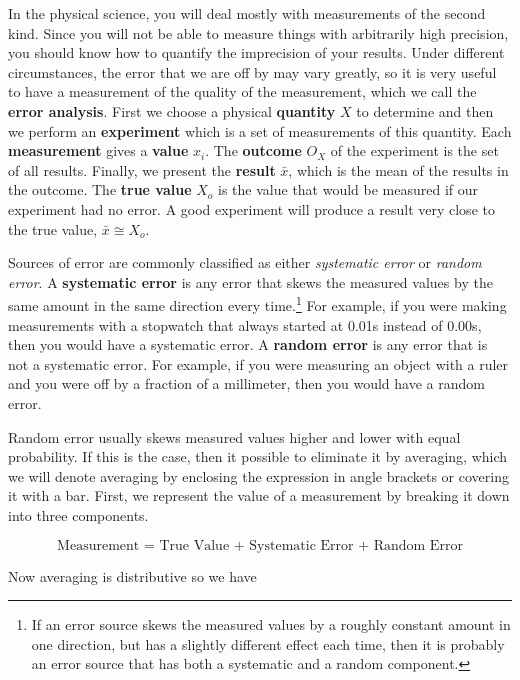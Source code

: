 In the physical science, you will deal mostly with measurements of the second kind. Since you will not be able to measure things with arbitrarily high precision, you should know how to quantify the imprecision of your results.
 Under different circumstances, the error that we are off by may vary greatly, so it is very useful to have a measurement of the quality of the measurement, which we call the \textbf{error analysis}. First we choose a physical \textbf{quantity} $X$ to determine and then we perform an \textbf{experiment} which is a set of measurements of this quantity. Each \textbf{measurement} gives a \textbf{value} $x_i$. The \textbf{outcome} $O_X$ of the experiment is the set of all results. Finally, we present the \textbf{result} $\bar{x}$, which is the mean of the results in the outcome. The \textbf{true value} $X_o$ is the value that would be measured if our experiment had no error. A good experiment will produce a result very close to the true value, $\bar{x} \cong X_o$.

Sources of error are commonly classified as either \textit{systematic error} or \textit{random error}. A \textbf{systematic error} is any error that skews the measured values by the same amount in the same direction every time.\footnote{If an error source skews the measured values by a roughly constant amount in one direction, but has a slightly different effect each time, then it is probably an error source that has both a systematic and a random component.} For example, if you were making measurements with a stopwatch that always started at 0.01s instead of 0.00s, then you would have a systematic error. A \textbf{random error} is any error that is not a systematic error. For example, if you were measuring an object with a ruler and you were off by a fraction of a millimeter, then you would have a random error. 

Random error usually skews measured values higher and lower with equal probability. If this is the case, then it possible to eliminate it by averaging, which we will denote averaging by enclosing the expression in angle brackets or covering it with a bar. First, we represent the value of a measurement by breaking it down into three components.

\[\textrm{Measurement = True Value + Systematic Error + Random Error}\]

Now averaging is distributive so we have

